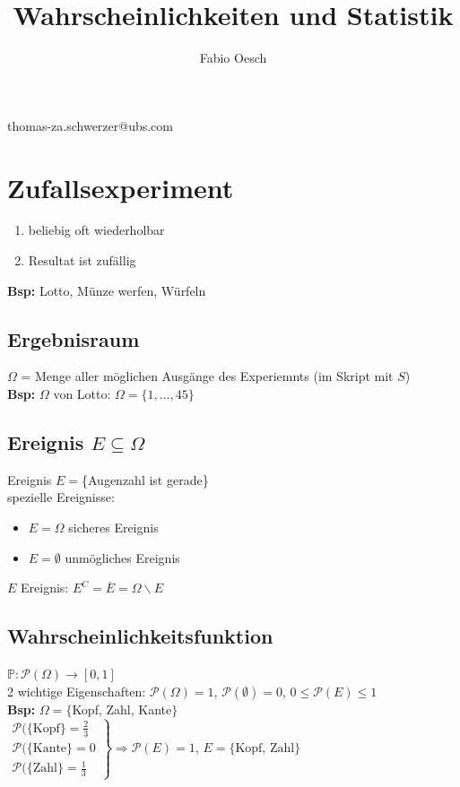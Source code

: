 \documentclass[a4paper,10pt]{article}
\author{Fabio Oesch}
\title{Wahrscheinlichkeiten und Statistik}
\newcommand{\PN}{\mathbb{P}}
\newcommand{\Potp}{\mathcal{P}} %
\newcommand{\Bold}[1]{\textbf{#1}} %
\newcommand{\T}[1]{\text{#1}} %
\newcommand{\Ra}{\Rightarrow}
\newcommand{\Brackar}[2]{\left.\begin{array}{#1} #2 \end{array}\right\rbrace} %
\newcommand{\Oneover}[1]{\frac{1}{#1}} %
\begin{document}
\maketitle
\pagebreak
\tableofcontents
\pagebreak
thomas-za.schwerzer@ubs.com
\section{Zufallsexperiment}
\begin{enumerate}
 \item beliebig oft wiederholbar
 \item Resultat ist zufällig
\end{enumerate}
\Bold{Bsp:} Lotto, Münze werfen, Würfeln
\subsection{Ergebnisraum}
$\Omega$ = Menge aller möglichen Ausgänge des Experiemnts (im Skript mit $S$)\\
\Bold{Bsp:} $\Omega$ von Lotto: $\Omega=\{1,\dots,45\}$\\
\subsection{Ereignis $E\subseteq\Omega$}
Ereignis $E=$\{Augenzahl ist gerade\}\\
spezielle Ereignisse:
\begin{itemize}
 \item $E=\Omega$ sicheres Ereignis
 \item $E=\emptyset$ unmögliches Ereignis
\end{itemize}
$E$ Ereignis: $E^C=\overline{E}=\Omega\backslash E$
\subsection{Wahrscheinlichkeitsfunktion}
$\PN:\Potp(\Omega) \to[0,1]$\\
2 wichtige Eigenschaften: $\Potp(\Omega) = 1$, $\Potp(\emptyset)=0$, $0\leq\Potp(E)\leq1$\\
\Bold{Bsp:} $\Omega = \{$Kopf, Zahl, Kante$\}$\\
$\Brackar{l}{\Potp(\{\T{Kopf}\}=\frac{2}{3}\\
\Potp(\{\T{Kante}\}=0\\
\Potp(\{\T{Zahl}\}=\Oneover{3}}\Ra\Potp(E)=1$, $E=\{\T{Kopf, Zahl}\}$
\end{document}
